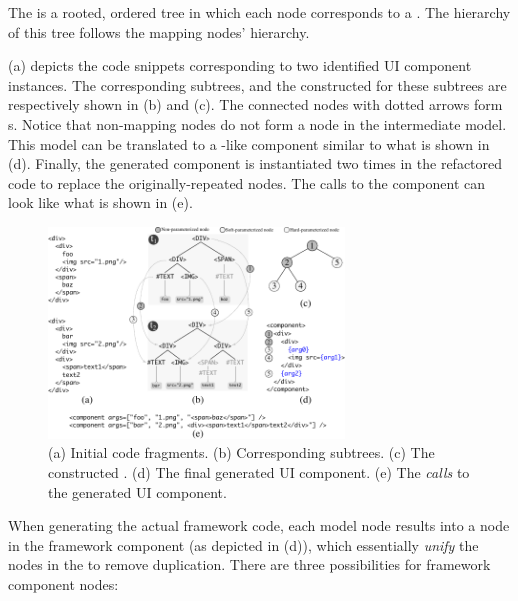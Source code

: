 \begin{defn}[\textbf{\model}]
	The \model is a rooted, ordered tree
	in which each node corresponds to a \mappedset.
	The hierarchy of this tree follows the mapping \dom nodes' hierarchy.
\end{defn}


 (a) 
depicts the \html code snippets 
corresponding to two identified UI component instances.
The corresponding \dom subtrees,
and the constructed \model for these subtrees 
are respectively shown in (b) and (c).
The connected \dom nodes with dotted arrows form {\mappedset}s.
Notice that non-mapping \dom nodes do not form a node in the intermediate model.
This model can be translated to a \react-like component
similar to what is shown in (d).
Finally, the generated component is instantiated two times in the refactored \html code
to replace the originally-repeated \dom nodes.
The calls to the component can look like what is shown in (e).

\begin{figure}
    \centering
    \includegraphics[width=0.70\textwidth]{maintainability/figures/intermediate-model}
    \caption{
    	(a) Initial \html code fragments.
     	(b) Corresponding \dom subtrees.
     	(c) The constructed \model.
     	(d) The final generated UI component.
     	(e) The \textit{calls} to the generated UI component.}
    \label{fig:intermediate-model-sample-dom-subtrees}
\end{figure} 

When generating the actual framework code,
each model node results into a \dom node in the framework component
(as depicted in (d)),
which essentially \textit{unify} the nodes in the \mappedset
to remove duplication.
There are three possibilities for framework component \dom nodes:

